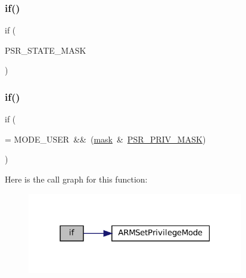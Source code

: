 \mbox{\label{isa-arm_8c_a0736bf8f9c6b829a423d7d7a43b781e8}} 
\subsubsection{\texorpdfstring{if()}{if()}\hspace{0.1cm}{\footnotesize\ttfamily [1/3]}}
{\footnotesize\ttfamily if (\begin{DoxyParamCaption}\item[{\mbox{\hyperlink{isa-arm_8c_a9fa3ab2bb634e0dde316d74d14fa564f}{mask}} \&}]{P\+S\+R\+\_\+\+S\+T\+A\+T\+E\+\_\+\+M\+A\+SK }\end{DoxyParamCaption})}

\mbox{\label{isa-arm_8c_a9e03ac731cde2b545260afb666c2af44}} 
\subsubsection{\texorpdfstring{if()}{if()}\hspace{0.1cm}{\footnotesize\ttfamily [2/3]}}
{\footnotesize\ttfamily if (\begin{DoxyParamCaption}\item[{cpu-\/$>$privilege\+Mode !}]{ = {\ttfamily MODE\+\_\+USER~\&\&~(\mbox{\hyperlink{isa-arm_8c_a9fa3ab2bb634e0dde316d74d14fa564f}{mask}}~\&~\mbox{\hyperlink{isa-arm_8c_a808e705b60d550b9aa7f5111d431fc0c}{P\+S\+R\+\_\+\+P\+R\+I\+V\+\_\+\+M\+A\+SK}})} }\end{DoxyParamCaption})}

Here is the call graph for this function\+:
\nopagebreak
\begin{figure}[H]
\begin{center}
\leavevmode
\includegraphics[width=268pt]{isa-arm_8c_a9e03ac731cde2b545260afb666c2af44_cgraph}
\end{center}
\end{figure}
\mbox{\label{isa-arm_8c_a2427b94b113c588ba9ead25c8cb63fbe}} 
